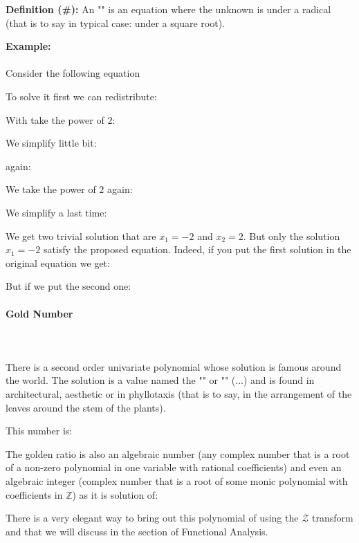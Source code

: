 	\textbf{Definition  (\#\mydef):} An "" is an equation where the unknown is under a radical (that is to say in typical case: under a square root).
	
	\begin{tcolorbox}[colframe=black,colback=white,sharp corners]
	\textbf{{\Large {}}Example:}\\\\
	Consider the following equation
	
	To solve it first we can redistribute:
	
	With take the power of $2$:
	
	We simplify little bit:
	
	again:
	
	We take the power of $2$ again:
	
	We simplify a last time:
	
	We get two trivial solution that are $x_1=-2$ and $x_2=2$. But only the solution $x_1=-2$ satisfy the proposed equation. Indeed, if you put the first solution in the original equation we get:
	
	But if we put the second one:
		
	\end{tcolorbox}
	
	\pagebreak
	\paragraph{Gold Number}\mbox{}\\\\
	There is a second order univariate polynomial whose solution is famous around the world. The solution is a value named the "" or "" (...) and is found in architectural, aesthetic or in phyllotaxis (that is to say, in the arrangement of the leaves around the stem of the plants).
	
	This number is:
	
	The golden ratio is also an algebraic number (any complex number that is a root of a non-zero polynomial in one variable with rational coefficients) and even an algebraic integer (complex number that is a root of some monic polynomial with coefficients in $\mathbb{Z}$) as it is solution of:
	
	There is a very elegant way to bring out this polynomial of using the $\mathcal{Z}$ transform and that we will discuss in the section of Functional Analysis.
	
